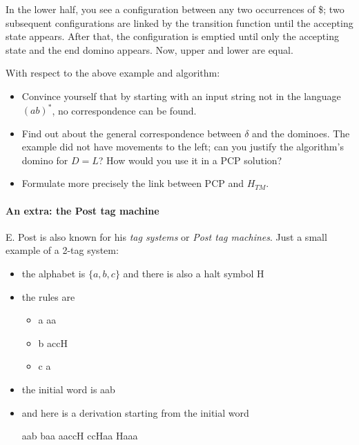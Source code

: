 In the lower half, you see a configuration between any two occurrences of \$;
two subsequent configurations are linked by the
transition function until the accepting state appears. After that,
the configuration is emptied until only the accepting state and the
end domino appears. Now, upper and lower are equal.


\begin{exercise}
With respect to the above example and algorithm:
\begin{itemize}
\item
Convince yourself that by starting with an input string not in the
language $(ab)^*$, no correspondence can be found.

\item Find out about the general correspondence between $\delta$ and the
dominoes. The example did not have movements to the left; can you justify the algorithm's domino for $D = L$? How would you use it in a PCP solution?

\item Formulate more precisely the link between PCP and $H_{TM}$.
\end{itemize}
\end{exercise}




\paragraph{An extra: the Post tag machine}

E. Post is also known for his {\em tag systems} or {\em Post tag
  machines}. Just a small example of a 2-tag system:

\begin{itemize}
\item the alphabet is $\{a,b,c\}$ and there is also a halt symbol H
\item the rules are
\begin{itemize}
\item a \rpijl aa
\item b \rpijl accH
\item c \rpijl a
\end{itemize}

\item the initial word is aab
\item and here is a derivation starting from the initial word

aab \rpijl baa \rpijl aaccH \rpijl ccHaa \rpijl Haaa
\end{itemize}

